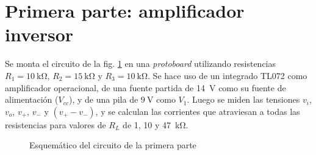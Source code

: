 \section{Primera parte: amplificador inversor}

Se monta el circuito de la fig. \ref{fig:1:esquema} en una \textit{protoboard}
utilizando resistencias $R_1 = \SI{10}{\kilo\ohm}$, $R_2 = \SI{15}{\kilo\ohm}$ y
$R_3 = \SI{10}{\kilo\ohm}$. Se hace uso de un integrado TL072 como amplificador
operacional, de una fuente partida de \SI{14}{\volt} como su fuente de 
alimentación ($V_{cc}$), y de una pila de $\SI{9}{\volt}$ como $V_1$.
Luego se miden las tensiones $v_i$, $v_o$, $v_{+}$,
$v_{-}$ y $\left(v_{+} - v_{-}\right)$, y se calculan las corrientes que
atraviesan a todas las resistencias para valores de $R_L$ de 1, 10 y
\SI{47}{\kilo\ohm}.

\begin{figure}[H]
    \centering
    
    \caption{Esquemático del circuito de la primera parte}
    \label{fig:1:esquema}
\end{figure}









% 
